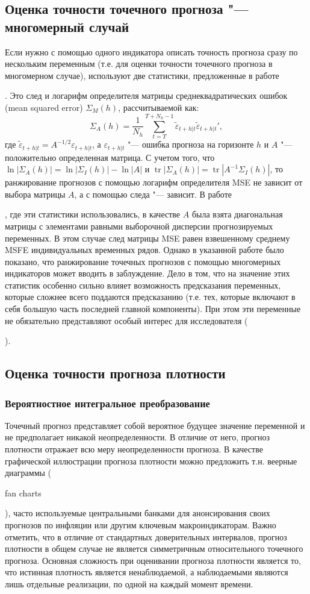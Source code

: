 \documentclass[11pt]{article} %
\DeclareMathOperator{\tr}{tr}
\newcommand{\eng}[1]{\begin{otherlanguage}{english}#1\end{otherlanguage}}
\begin{document}
\subsection{Оценка точности точечного прогноза "--- многомерный случай}
Если нужно с помощью одного индикатора описать точность прогноза сразу по нескольким переменным (т.е. для оценки точности точечного прогноза в многомерном случае), используют две статистики, предложенные в работе \eng{\cite{adolfson_al_2007}}. Это след и логарифм определителя матрицы  среднеквадратических ошибок (mean squared error) $\Sigma_M(h)$, рассчитываемой как:
\begin{equation}
\Sigma_A(h)=\frac{1}{N_h}\sum_{t=T}^{T+N_h-1} \tilde \varepsilon_{t+h|t}\tilde \varepsilon_{t+h|t}',
\end{equation}
где  $\tilde \varepsilon_{t+h|t}= A^{-1/2} \varepsilon_{t+h|t}$, а $\varepsilon_{t+h|t}$ "--- ошибка прогноза на горизонте $h$ и $A$ "--- положительно определенная матрица.
С учетом того, что $\ln |\Sigma_A(h)| = \ln|\Sigma_I(h)|-\ln|A|$ и  $\tr|\Sigma_A(h)| = \tr|A^{-1}\Sigma_I(h)|$, то ранжирование прогнозов с помощью логарифм определителя MSE не зависит от выбора матрицы $A$, а с помощью следа "--- зависит. В работе \eng{\cite{adolfson_al_2007}}, где эти статистики использовались, в качестве $A$ была взята диагональная матрицы с элементами равными выборочной дисперсии прогнозируемых переменных. В этом случае след матрицы MSE равен взвешенному среднему MSFE индивидуальных временных рядов. Однако в указанной работе было  показано, что ранжирование точечных прогнозов с помощью многомерных индикаторов может вводить в заблуждение. Дело в том, что на значение этих статистик особенно сильно влияет возможность предсказания переменных, которые сложнее всего поддаются предсказанию (т.е. тех, которые включают в себя большую часть последней главной компоненты). При этом эти переменные не обязательно представляют особый интерес для исследователя (\eng{\cite{adolfson_al_2007}}).





\subsection{Оценка точности прогноза плотности}
\subsubsection{Вероятностное интегральное преобразование}
Точечный прогноз представляет собой  вероятное будущее значение переменной и не предполагает никакой неопределенности. В отличие от него, прогноз плотности отражает всю меру неопределенности прогноза. В качестве графической иллюстрации прогноза плотности можно предложить т.н. веерные  диаграммы (\eng{fan charts}), часто используемые центральными банками для анонсирования своих прогнозов по инфляции или другим ключевым макроиндикаторам. Важно отметить, что в отличие от стандартных доверительных интервалов, прогноз плотности в общем случае не является симметричным относительного точечного прогноза.
Основная сложность при оценивании прогноза плотности является то, что истинная плотность является ненаблюдаемой, а наблюдаемыми являются лишь отдельные реализации, по одной на каждый момент времени.
\end{document}
